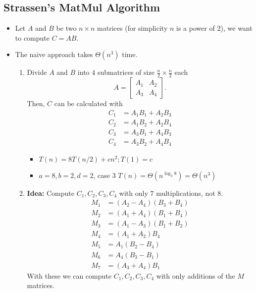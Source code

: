 \documentclass[a4paper,12pt]{article}
\begin{document}
\subsection{Strassen's MatMul Algorithm}
\begin{itemize}
    \item Let $A$ and $B$ be two $n\times n$ matrices (for simplicity $n$ is a power of 2), we want to compute $C=AB$.
    \item The naive approach takes $\Theta(n^3)$ time.
    \begin{enumerate}
        \item Divide $A$ and $B$ into $4$ submatrices of size $\frac{n}{2}\times\frac{n}{2}$ each
        \begin{equation}
            A = \begin{bmatrix}
                A_{1} & A_{2}\\
                A_{3} & A_{4}
            \end{bmatrix}.
        \end{equation}
        Then, $C$ can be calculated with
        \begin{align}
            C_1 &= A_1B_1 + A_2B_3\\
            C_2 &= A_1B_2 + A_2B_4\\
            C_3 &= A_3B_1 + A_4B_3\\
            C_4 &= A_3B_2 + A_4B_4
        \end{align}
        \begin{itemize}
            \item $T(n)=8T(n/2)+cn^2; T(1)=c$
            \item $a=8,b=2,d=2$, case 3 $T(n)=\Theta(n^{\log_2 8})=\Theta(n^3)$
        \end{itemize}
        \item \textbf{Idea:} Compute $C_1,C_2,C_3,C_4$ with only $7$ multiplications, not 8.
        \begin{align}
            M_1 &= (A_2-A_4)(B_3+B_4)\\
            M_2 &= (A_1+A_4)(B_1+B_4)\\
            M_3 &= (A_1-A_3)(B_1+B_2)\\
            M_4 &= (A_1+A_2)B_4\\
            M_5 &= A_1(B_2-B_4)\\
            M_6 &= A_4(B_3-B_1)\\
            M_7 &= (A_3+A_4)B_1
        \end{align}
        With these we can compute $C_1,C_2,C_3,C_4$ with only additions of the $M$ matrices.

\end{enumerate}
\end{itemize}
\end{document}
